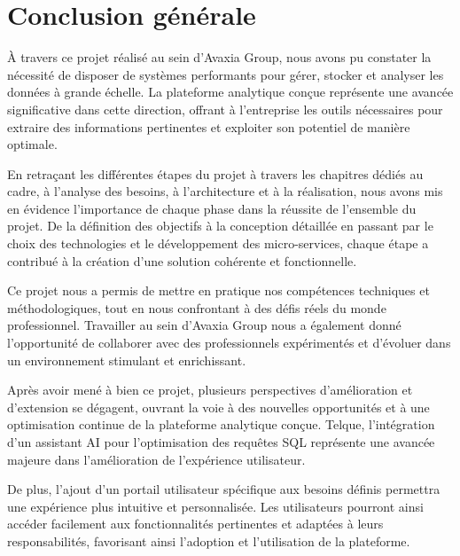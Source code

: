 \chapter*{Conclusion générale}

\par À travers ce projet réalisé au sein d'Avaxia Group, nous avons pu constater la nécessité de disposer de systèmes performants pour gérer, 
stocker et analyser les données à grande échelle. La plateforme analytique conçue représente une avancée significative dans cette direction, 
offrant à l'entreprise les outils nécessaires pour extraire des informations pertinentes et exploiter son potentiel de manière optimale.

\par En retraçant les différentes étapes du projet à travers les chapitres dédiés au cadre, à l'analyse des besoins, à l'architecture et
 à la réalisation, nous avons mis en évidence l'importance de chaque phase dans la réussite de l'ensemble du projet. De la définition 
 des objectifs à la conception détaillée en passant par le choix des technologies et le développement des micro-services, chaque étape 
 a contribué à la création d'une solution cohérente et fonctionnelle.
 
 \par Ce projet nous a permis de mettre en pratique nos compétences techniques et méthodologiques, tout en nous confrontant à des défis
  réels du monde professionnel. Travailler au sein d'Avaxia Group nous a également donné l'opportunité de collaborer avec des professionnels
   expérimentés et d'évoluer dans un environnement stimulant et enrichissant.

   \par Après avoir mené à bien ce projet, plusieurs perspectives d'amélioration et d'extension se dégagent,
 ouvrant la voie à des nouvelles opportunités et à une optimisation continue de la plateforme analytique conçue. Telque, l'intégration d'un assistant AI 
 pour l'optimisation des requêtes SQL représente une avancée majeure dans l'amélioration de l'expérience utilisateur. 
 
 \par De plus, l'ajout d'un portail utilisateur spécifique aux besoins définis permettra une expérience plus intuitive et personnalisée. 
 Les utilisateurs pourront ainsi accéder facilement aux fonctionnalités pertinentes et adaptées à leurs responsabilités, favorisant ainsi 
 l'adoption et l'utilisation de la plateforme.
 
